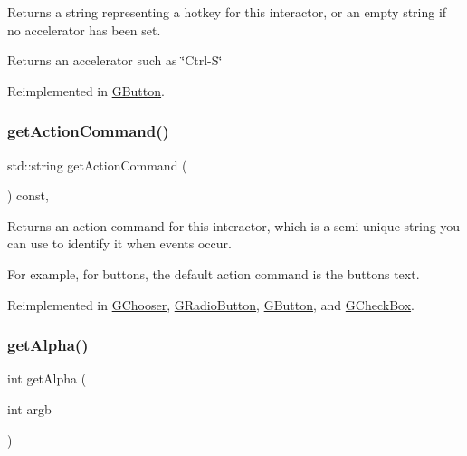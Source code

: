 Returns a string representing a hotkey for this interactor, or an empty string if no accelerator has been set. 

\begin{DoxyReturn}{Returns}
an accelerator such as \char`\"{}\+Ctrl-\/\+S\char`\"{} 
\end{DoxyReturn}


Reimplemented in \mbox{\hyperlink{classGButton_a57806dc9defb73f76f493f8548319924}{G\+Button}}.

\mbox{\label{classGInteractor_a94eb4276000c4fdfb508ce9e6317a82a}} 
\subsubsection{\texorpdfstring{get\+Action\+Command()}{getActionCommand()}}
{\footnotesize\ttfamily std\+::string get\+Action\+Command (\begin{DoxyParamCaption}{ }\end{DoxyParamCaption}) const\hspace{0.3cm}{\ttfamily [virtual]}, {\ttfamily [inherited]}}



Returns an action command for this interactor, which is a semi-\/unique string you can use to identify it when events occur. 

For example, for buttons, the default action command is the button\textquotesingle{}s text. 

Reimplemented in \mbox{\hyperlink{classGChooser_a4f83505141da1f8446f0e0e0a9507930}{G\+Chooser}}, \mbox{\hyperlink{classGRadioButton_a4f83505141da1f8446f0e0e0a9507930}{G\+Radio\+Button}}, \mbox{\hyperlink{classGButton_a4f83505141da1f8446f0e0e0a9507930}{G\+Button}}, and \mbox{\hyperlink{classGCheckBox_a4f83505141da1f8446f0e0e0a9507930}{G\+Check\+Box}}.

\mbox{\label{classGCanvas_a48d898ddf58651669b5f33240a65096f}} 
\subsubsection{\texorpdfstring{get\+Alpha()}{getAlpha()}}
{\footnotesize\ttfamily int get\+Alpha (\begin{DoxyParamCaption}\item[{int}]{argb }\end{DoxyParamCaption})\hspace{0.3cm}{\ttfamily [static]}}



